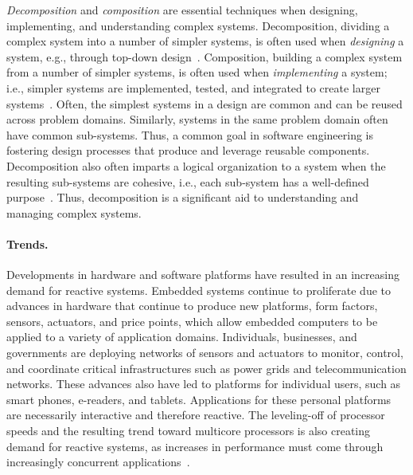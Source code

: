 \emph{Decomposition} and \emph{composition} are essential techniques when designing, implementing, and understanding complex systems.
Decomposition, dividing a complex system into a number of simpler systems, is often used when \emph{designing} a system, e.g., through top-down design~\cite{wirth1971program}.
Composition, building a complex system from a number of simpler systems, is often used when \emph{implementing} a system; i.e., simpler systems are implemented, tested, and integrated to create larger systems~\cite{brooks1995mythical}.
Often, the simplest systems in a design are common and can be reused across problem domains.
Similarly, systems in the same problem domain often have common sub-systems.
Thus, a common goal in software engineering is fostering design processes that produce and leverage reusable components.
Decomposition also often imparts a logical organization to a system when the resulting sub-systems are cohesive, i.e., each sub-system has a well-defined purpose~\cite{parnas1972criteria}.
Thus, decomposition is a significant aid to understanding and managing complex systems.

\paragraph{Trends.}
Developments in hardware and software platforms have resulted in an increasing demand for reactive systems.
Embedded systems continue to proliferate due to advances in hardware that continue to produce new platforms, form factors, sensors, actuators, and price points, which allow embedded computers to be applied to a variety of application domains.
Individuals, businesses, and governments are deploying networks of sensors and actuators to monitor, control, and coordinate critical infrastructures such as power grids and telecommunication networks.
These advances also have led to platforms for individual users, such as smart phones, e-readers, and tablets.
Applications for these personal platforms are necessarily interactive and therefore reactive.
The leveling-off of processor speeds and the resulting trend toward multicore processors is also creating demand for reactive systems, as increases in performance must come through increasingly concurrent applications~\cite{sutter2005software}.

